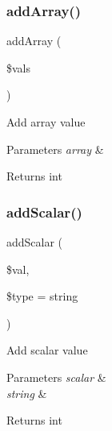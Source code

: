 \subsubsection{\texorpdfstring{add\+Array()}{addArray()}}
{\footnotesize\ttfamily add\+Array (\begin{DoxyParamCaption}\item[{}]{\$vals }\end{DoxyParamCaption})}

Add array value


\begin{DoxyParams}{Parameters}
{\em array} & \\
\hline
\end{DoxyParams}
\begin{DoxyReturn}{Returns}
int 
\end{DoxyReturn}
\mbox{\label{class_x_m_l___r_p_c___values_ac847166eee63ab7bfaa8b0e22ae19430}} 
\subsubsection{\texorpdfstring{add\+Scalar()}{addScalar()}}
{\footnotesize\ttfamily add\+Scalar (\begin{DoxyParamCaption}\item[{}]{\$val,  }\item[{}]{\$type = {\ttfamily \textquotesingle{}string\textquotesingle{}} }\end{DoxyParamCaption})}

Add scalar value


\begin{DoxyParams}{Parameters}
{\em scalar} & \\
\hline
{\em string} & \\
\hline
\end{DoxyParams}
\begin{DoxyReturn}{Returns}
int 
\end{DoxyReturn}
\mbox{\label{class_x_m_l___r_p_c___values_a5dbdf0121566791a201cd07a3de15531}} 
